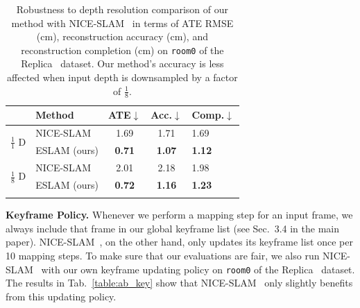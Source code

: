 \begin{table}[t]
    \begin{center}
        \begin{tabular}{l|l|ccl}
            \Xhline{2\arrayrulewidth}
            & \small Method & \small ATE$\downarrow$ & \small Acc.$\downarrow$ & \small Comp.$\downarrow$ \\
            
            \hline
            \multirow{2}{*}{\small $\frac{1}{1}$ D}
            & \small NICE-SLAM~\cite{zhu2022nice} & 1.69 & 1.71 & 1.69 \\
            & \small ESLAM (ours) & \textbf{0.71} & \textbf{1.07} & \textbf{1.12} \\

            \hline
            \multirow{2}{*}{\small $\frac{1}{8}$ D} & \small NICE-SLAM~\cite{zhu2022nice} & 2.01 & 2.18 & 1.98 \\
            & \small ESLAM (ours) & \textbf{0.72} & \textbf{1.16} & \textbf{1.23} \\
            
            \Xhline{2\arrayrulewidth}
        \end{tabular}
    \end{center}
    \caption{Robustness to depth resolution comparison of our method with NICE-SLAM~\cite{zhu2022nice} in terms of ATE RMSE (cm), reconstruction accuracy (cm), and reconstruction completion (cm) on \texttt{room0} of the Replica~\cite{replica19arxiv} dataset. Our method's accuracy is less affected when input depth is downsampled by a factor of $\frac{1}{8}$.}
    \label{table:ab_depth}
\end{table}

\vspace{1ex}
\noindent\textbf{Keyframe Policy.} Whenever we perform a mapping step for an input frame, we always include that frame in our global keyframe list (see Sec.~3.4 in the main paper). NICE-SLAM~\cite{zhu2022nice}, on the other hand, only updates its keyframe list once per 10 mapping steps. To make sure that our evaluations are fair, we also run NICE-SLAM~\cite{zhu2022nice} with our own keyframe updating policy on \texttt{room0} of the Replica~\cite{replica19arxiv} dataset. The results in Tab.~\ref{table:ab_key} show that NICE-SLAM~\cite{zhu2022nice} only slightly benefits from this updating policy.

